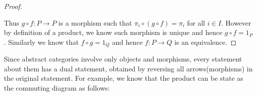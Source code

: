 \begin{proof}
\begin{center}
\end{center}
Thus $g\circ f:P\to P$ is a morphism such that $\pi_i\circ(g\circ f)=\pi_i$ for all $i\in I$. However by definition of a product, we know such morphism is unique and hence $g\circ f=1_P$. Similarly we know that $f\circ g=1_Q$ and hence $f:P\to Q$ is an equivalence.
\end{proof}
Since abstract categories involve only objects and morphisms, every statement about them has a dual statement, obtained by reversing all arrows(morphisms) in the original statement. For example, we know that the product can be state as the commuting diagram as follows:
